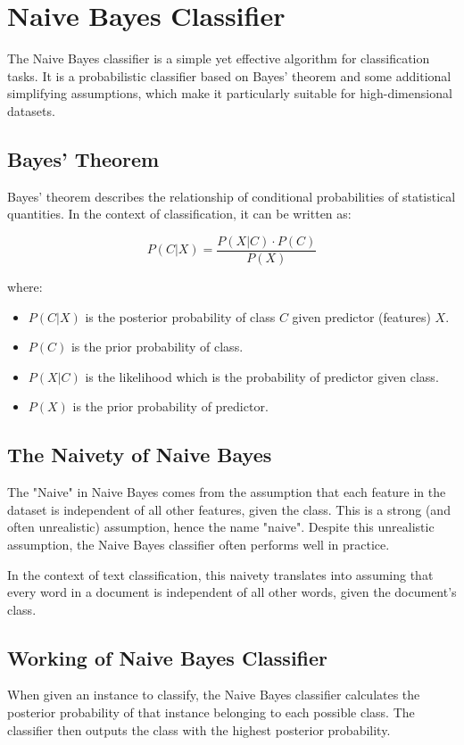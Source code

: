 \chapter{Naive Bayes Classifier}


The Naive Bayes classifier is a simple yet effective algorithm for classification tasks. It is a probabilistic classifier based on Bayes' theorem and some additional simplifying assumptions, which make it particularly suitable for high-dimensional datasets.

\section{Bayes' Theorem}
Bayes' theorem describes the relationship of conditional probabilities of statistical quantities. In the context of classification, it can be written as:

\begin{equation*}
P(C|X) = \frac{P(X|C) \cdot P(C)}{P(X)}
\end{equation*}

where:
\begin{itemize}
\item $P(C|X)$ is the posterior probability of class $C$ given predictor (features) $X$.
\item $P(C)$ is the prior probability of class.
\item $P(X|C)$ is the likelihood which is the probability of predictor given class.
\item $P(X)$ is the prior probability of predictor.
\end{itemize}

\section{The Naivety of Naive Bayes}
The "Naive" in Naive Bayes comes from the assumption that each feature in the dataset is independent of all other features, given the class. This is a strong (and often unrealistic) assumption, hence the name "naive". Despite this unrealistic assumption, the Naive Bayes classifier often performs well in practice.

In the context of text classification, this naivety translates into assuming that every word in a document is independent of all other words, given the document's class.

\section{Working of Naive Bayes Classifier}
When given an instance to classify, the Naive Bayes classifier calculates the posterior probability of that instance belonging to each possible class. The classifier then outputs the class with the highest posterior probability.

